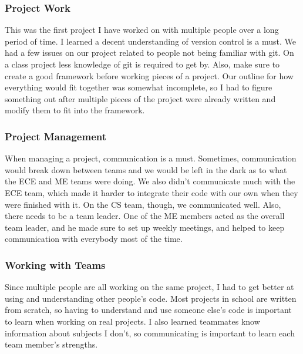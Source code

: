 \documentclass[10pt,letterpaper,onecolumn,draftclsnofoot,journal]{IEEEtran}
\begin{document}
\subsubsection{\textbf{Project Work}}
This was the first project I have worked on with multiple people over a long period of time. I learned a decent understanding of version control is a must. We had a few issues on our project related to people not being familiar with git. On a class project less knowledge of git is required to get by. Also, make sure to create a good framework before working pieces of a project. Our outline for how everything would fit together was somewhat incomplete, so I had to figure something out after multiple pieces of the project were already written and modify them to fit into the framework.\vspace{.3cm}

\subsubsection{\textbf{Project Management}}
When managing a project, communication is a must. Sometimes, communication would break down between teams and we would be left in the dark as to what the ECE and ME teams were doing. We also didn't communicate much with the ECE team, which made it harder to integrate their code with our own when they were finished with it. On the CS team, though, we communicated well. Also, there needs to be a team leader. One of the ME members acted as the overall team leader, and he made sure to set up weekly meetings, and helped to keep communication with everybody most of the time.\vspace{.3cm}

\subsubsection{\textbf{Working with Teams}}
Since multiple people are all working on the same project, I had to get better at using and understanding other people's code. Most projects in school are written from scratch, so having to understand and use someone else's code is important to learn when working on real projects. I also learned teammates know information about subjects I don't, so communicating is important to learn each team member's strengths.\vspace{.3cm}
\end{document}
